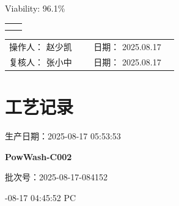 \documentclass[UTF8,10pt,a4paper,fontset=fandol]{ctexart}
\newcommand{\fieldvalue}[1]{#1}
\newcommand{\handwritten}[1]{#1}
\begin{document}
\vspace{0.8em}

\textnormal{Viability: }\fieldvalue{96.1\%}

\vspace{1em}

\begin{center}
\begin{tabular}{@{}cc@{}}
\fbox{\rule{0pt}{3.0cm}\rule{0.40\linewidth}{0pt}} &
\fbox{\rule{0pt}{3.0cm}\rule{0.40\linewidth}{0pt}} \\[1.5cm]
\fbox{\rule{0pt}{3.0cm}\rule{0.40\linewidth}{0pt}} &
\fbox{\rule{0pt}{3.0cm}\rule{0.40\linewidth}{0pt}}
\end{tabular}
\end{center}

\vfill

\noindent
\begin{tabular}{@{}p{0.45\linewidth}p{0.45\linewidth}@{}}
操作人：
\fieldvalue{\handwritten{赵少凯}}
&
日期：
\fieldvalue{\handwritten{2025.08.17}}
\\[0.8em]
复核人：
\fieldvalue{\handwritten{张小中}}
&
日期：
\fieldvalue{\handwritten{2025.08.17}}
\end{tabular}

\rmfamily

\newpage

\section*{工艺记录}

\noindent
生产日期：2025-08-17 05:53:53

\noindent
\textbf{PowWash-C002}

\noindent
批次号：2025-08-17-084152

 -08-17 04:45:52 \quad PC
\end{document}

